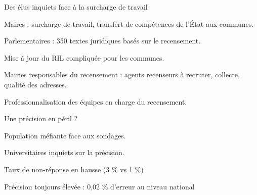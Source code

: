 \documentclass[10pt,xcolor=table,color={dvipsnames,usenames},ignorenonframetext,usepdftitle=false,french]{beamer}
\begin{document}
\begin{frame}{Des élus inquiets face à la surcharge de travail}
\protect\hypertarget{des-uxe9lus-inquiets-face-uxe0-la-surcharge-de-travail}{}
\begin{center}\bcattention \end{center}

\faQuestionCircle{} Maires : surcharge de travail, transfert de
compétences de l'État aux communes.

\faQuestionCircle{} Parlementaires : 350 textes juridiques basés sur le
recensement.

\begin{center}\bcsmmh\end{center}

\faMinusCircle{} Mise à jour du RIL compliquée pour les communes.

\faMinusCircle{} Mairies responsables du recensement : agents recenseurs
à recruter, collecte, qualité des adresses.

\begin{center}\bcsmbh\end{center}

\faPlusCircle{} Professionnalisation des équipes en charge du
recensement.
\end{frame}

\begin{frame}{Une précision en péril ?}
\protect\hypertarget{une-pruxe9cision-en-puxe9ril}{}
\begin{center}\bcattention \end{center}

\faQuestionCircle{} Population méfiante face aux sondages.

\faQuestionCircle{} Universitaires inquiets sur la précision.

\begin{center}\bcsmmh\end{center}

\faMinusCircle{} Taux de non-réponse en hausse (3 \% vs 1 \%)

\begin{center}\bcsmbh\end{center}

\faPlusCircle{} Précision toujours élevée : 0,02 \% d'erreur au niveau
national
\end{frame}
\end{document}
